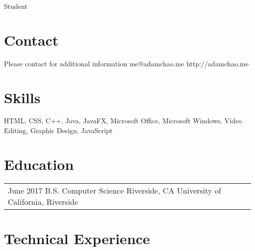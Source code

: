 \documentclass[print]{friggeri-cv} %
\makeatletter
\renewenvironment{entrylist}{%
	\par\begin{tabular*}{\textwidth}{@{\extracolsep{\fill}}ll}
	}{%
\end{tabular*}\par
}
\makeatother
\begin{document}
{Student} %


\begin{aside} %
\section{Contact}
Please contact for additional information
me@adamchao.me
http://adamchao.me
\section{Skills}
HTML, CSS, C++, Java, JavaFX, Microsoft Office, Microsoft Windows, Video Editing, Graphic Design, JavaScript
\end{aside}


\section{Education}

\begin{entrylist}
\entry
	{June 2017}
	{B.S. Computer Science}
	{Riverside, CA}
	{University of California, Riverside}
	
\end{entrylist}


\section{Technical Experience}
\end{document}
